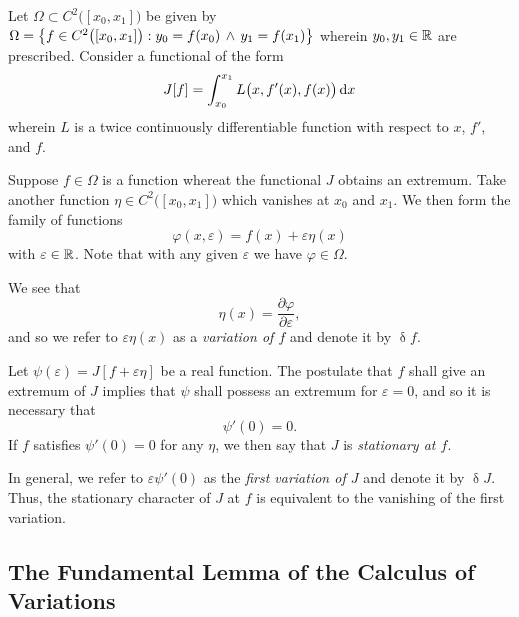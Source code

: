 Let \(\Omega \subset C^2\big([x_0, x_1]\big)\) be given by \(\Omega = \set*{f \in C^2\big([x_0, x_1]\big) : y_0 = f(x_0)
\, \land \, y_1 = f(x_1)}\) wherein \(y_0, y_1 \in \setreal\) are prescribed. Consider a functional of the form
\begin{align}
  \label{eq0}
  J[f] = \int_{x_0}^{x_1} L\big(x, f'(x), f(x)\big) \diff x
\end{align}
wherein \(L\) is a twice continuously differentiable function with respect to \(x\), \(f'\), and \(f\).

Suppose \(f \in \Omega\) is a function whereat the functional \(J\) obtains an extremum. Take another function
\(\eta \in C^2\big([x_0, x_1]\big)\) which vanishes at \(x_0\) and \(x_1\). We then form the family of functions
\[
  \varphi(x, \varepsilon) = f(x) + \varepsilon \eta(x)
\]
with \(\varepsilon \in \setreal\). Note that with any given \(\varepsilon\) we have \(\varphi \in \Omega\).

We see that
\[
  \eta(x) = \frac{\partial \varphi}{\partial \varepsilon},
\]
and so we refer to \(\varepsilon \eta(x)\) as a \emph{variation of \(f\)} and denote it by \(\updelta f\).

Let \(\psi(\varepsilon) = J[f + \varepsilon \eta]\) be a real function. The postulate that \(f\) shall give an extremum
of \(J\) implies that \(\psi\) shall possess an extremum for \(\varepsilon = 0\), and so it is necessary that
\[
  \psi'(0) = 0.
\]
If \(f\) satisfies \(\psi'(0) = 0\) for any \(\eta\), we then say that \(J\) is \emph{stationary at \(f\)}.

In general, we refer to \(\varepsilon \psi'(0)\) as the \emph{first variation of \(J\)} and denote it by \(\updelta J\).
Thus, the stationary character of \(J\) at \(f\) is equivalent to the vanishing of the first variation.

\subsection{The Fundamental Lemma of the Calculus of Variations}

